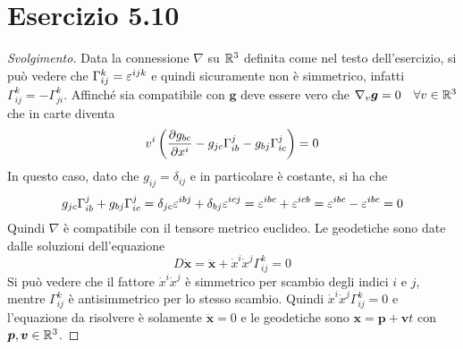 \documentclass[italian,a4paper,10pt]{article}
\begin{document}
\section*{Esercizio 5.10}
\begin{proof}[Svolgimento]
Data la connessione $\nabla$ su $\mathbb R^3$ definita come nel testo dell'esercizio, si può vedere che $\Gamma^k_{ij}=\varepsilon^{ijk}$ e quindi sicuramente non è simmetrico, infatti $\Gamma^k_{ij} = -\Gamma^k_{ji}$. 
Affinché sia compatibile con $\bm{g}$ deve essere vero che $\nabla_v \bm{g} = 0 \quad \forall v \in \mathbb R^3$ che in carte diventa $$v^i \left(\pdv{g_{bc}}{x^i} - g_{jc}\Gamma^j_{ib} - g_{bj}\Gamma^j_{ic}\right)=0$$
In questo caso, dato che $g_{ij}=\delta_{ij}$ e in particolare è costante, si ha che
\begin{equation*}
g_{jc}\Gamma^j_{ib} + g_{bj}\Gamma^j_{ic} = \delta_{jc}\varepsilon^{ibj} + \delta_{bj}\varepsilon^{icj} = \varepsilon^{ibc}+\varepsilon^{icb} = \varepsilon^{ibc}-\varepsilon^{ibc} = 0
\end{equation*}
Quindi $\nabla$ è compatibile con il tensore metrico euclideo. 
Le geodetiche sono date dalle soluzioni dell'equazione $$D\dot{\bm{x}}= \ddot{\bm{x}} + \dot{x}^i\dot{x}^j\Gamma^k_{ij}=0$$
Si può vedere che il fattore $\dot{x}^i\dot{x}^j$ è simmetrico per scambio degli indici $i$ e $j$, mentre $\Gamma^k_{ij}$ è antisimmetrico per lo stesso scambio. Quindi $\dot{x}^i\dot{x}^j\Gamma^k_{ij}=0$ e l'equazione da risolvere è solamente $\ddot{\bm{x}}=0$ e le geodetiche sono $\bm{x}=\bm{p}+\bm{v}t$ con $\bm{p},\bm{v} \in \mathbb R^3$.
\end{proof}
\end{document}
